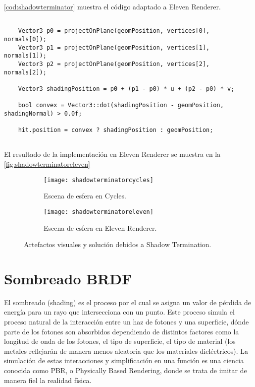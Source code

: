 \autoref{cod:shadowterminator} muestra el código adaptado a Eleven Renderer.

\begin{minipage}[c]{0.95\textwidth}
\begin{lstlisting}[label={cod:shadowterminator}, caption={Código Shadow Terminator.}]
	
	Vector3 p0 = projectOnPlane(geomPosition, vertices[0], normals[0]);
    Vector3 p1 = projectOnPlane(geomPosition, vertices[1], normals[1]);
    Vector3 p2 = projectOnPlane(geomPosition, vertices[2], normals[2]);

    Vector3 shadingPosition = p0 + (p1 - p0) * u + (p2 - p0) * v;

    bool convex = Vector3::dot(shadingPosition - geomPosition, shadingNormal) > 0.0f;
	
	hit.position = convex ? shadingPosition : geomPosition;
	
\end{lstlisting}
\end{minipage}

El resultado de la implementación en Eleven Renderer se muestra en la \autoref{fig:shadowterminatoreleven}

\begin{figure}[H]
	\centering
	  \begin{subfigure}[b]{0.4\textwidth}
		\texttt{[image: shadowterminatorcycles]}
		\caption{Escena de esfera en Cycles.}
		\label{fig:shadowterminatorcycles}
	  \end{subfigure}
	 \hfill
	  \begin{subfigure}[b]{0.4\textwidth}
		\texttt{[image: shadowterminatoreleven]}
		\caption{Escena de esfera en Eleven Renderer.}
		\label{fig:shadowterminatoreleven}
	  \end{subfigure}
	  \caption{Artefactos visuales y solución debidos a Shadow Termination.}
      \label{fig:shadowterminator}
	 \hfill
\end{figure}
	
\section{Sombreado BRDF}
	
El sombreado (shading) es el proceso por el cual se asigna un valor de pérdida de energía para un rayo que intersecciona con un punto. Este proceso simula el proceso natural de la interacción entre un haz de fotones y una superficie, dónde parte de los fotones son absorbidos dependiendo de distintos factores como la longitud de onda de los fotones, el tipo de superficie, el tipo de material (los metales reflejarán de manera menos aleatoria que los materiales dieléctricos). La simulación de estas interacciones y simplificación en una función es una ciencia conocida como PBR, o Physically Based Rendering, donde se trata de imitar de manera fiel la realidad física. 
		
